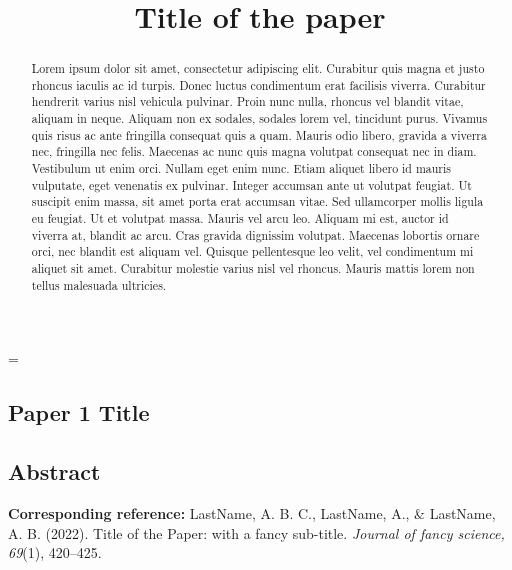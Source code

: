 \emergencystretch=\maxdimen
{}

\begin{refsection}

\title{Title of the paper}

\chapter{Paper 1 Title}


\vspace{-2cm}

\section{Abstract}

\vspace{-0.5em}
\begin{abstract}
Lorem ipsum dolor sit amet, consectetur adipiscing elit. Curabitur quis magna et justo rhoncus iaculis ac id turpis. Donec luctus condimentum erat facilisis viverra. Curabitur hendrerit varius nisl vehicula pulvinar. Proin nunc nulla, rhoncus vel blandit vitae, aliquam in neque. Aliquam non ex sodales, sodales lorem vel, tincidunt purus. Vivamus quis risus ac ante fringilla consequat quis a quam. Mauris odio libero, gravida a viverra nec, fringilla nec felis. Maecenas ac nunc quis magna volutpat consequat nec in diam. Vestibulum ut enim orci. Nullam eget enim nunc. Etiam aliquet libero id mauris vulputate, eget venenatis ex pulvinar. Integer accumsan ante ut volutpat feugiat. Ut suscipit enim massa, sit amet porta erat accumsan vitae. Sed ullamcorper mollis ligula eu feugiat. Ut et volutpat massa. Mauris vel arcu leo. Aliquam mi est, auctor id viverra at, blandit ac arcu. Cras gravida dignissim volutpat. Maecenas lobortis ornare orci, nec blandit est aliquam vel. Quisque pellentesque leo velit, vel condimentum mi aliquet sit amet. Curabitur molestie varius nisl vel rhoncus. Mauris mattis lorem non tellus malesuada ultricies.
\end{abstract}

\vspace*{\fill}
\begin{remark}
\textbf{Corresponding reference:} LastName, A. B. C., LastName, A., \& LastName, A. B. (2022). Title of the Paper: with a fancy sub-title. \textit{Journal of fancy science, 69}(1), 420–425.
\end{remark}




\end{refsection}
